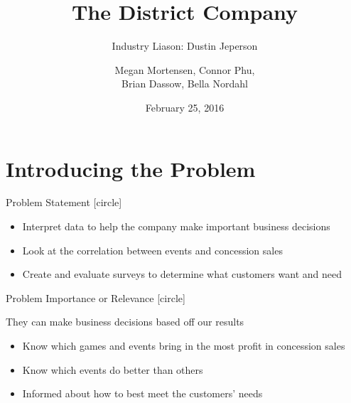 \documentclass[compress,blue]{beamer}
\title{The District Company}
\subtitle{Industry Liason: Dustin Jeperson}
\author{Megan Mortensen, Connor Phu, \\
Brian Dassow, Bella Nordahl}
\institute{\textbf{University of Wisconsin Stout} \\
}
\date{February 25, 2016}
\begin{document}
\frame{\titlepage}



\section{Introducing the Problem}

\begin{frame}{Problem Statement}
[circle]
\begin{itemize}
	\item Interpret data to help the company make important business decisions
	\item Look at the correlation between events and concession sales
	\item Create and evaluate surveys to determine what customers want and need
\end{itemize}
\end{frame}

\begin{frame}{Problem Importance or Relevance}
[circle]
	\item They can make business decisions based off our results
	\begin{itemize}
	  \item Know which games and events bring in the most profit in concession
	  sales
	  \item Know which events do better than others
	  \item Informed about how to best meet the customers' needs
	\end{itemize}
\end{frame}
\end{document}
